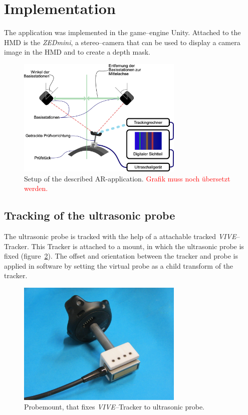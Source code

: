 \documentclass{VRARWorkshop}
\begin{document}
\section{Implementation}
The application was implemented in the game--engine Unity.
Attached to the HMD is the \textit{ZEDmini}, a stereo--camera that can be used to display a camera image in the HMD and to create a depth mask.

\cite{dorner_virtual_2013}

\begin{figure}[h!]
    \begin{center}
        \includegraphics[width=79mm]{images/Setup.eps}
        \caption{\label{fig:Setup} Setup of the described AR-application. \textcolor{red}{Grafik muss noch übersetzt werden.}}
    \end{center}
\end{figure}

\subsection{Tracking of the ultrasonic probe}
The ultrasonic probe is tracked with the help of a attachable tracked \textit{VIVE}--Tracker.
This Tracker is attached to a mount, in which the ultrasonic probe is fixed (figure~\ref{fig:probemount}).
The offset and orientation between the tracker and probe is applied in software by setting the virtual probe as a child transform of the tracker.

\begin{figure}[h!]
  \label{fig:probemount}
    \begin{center}
        \includegraphics[width=79mm]{images/probemount.jpg}
        \caption{\label{fig:probemount} Probemount, that fixes \textit{VIVE--}Tracker to ultrasonic probe.}
    \end{center}
\end{figure}
\end{document}
